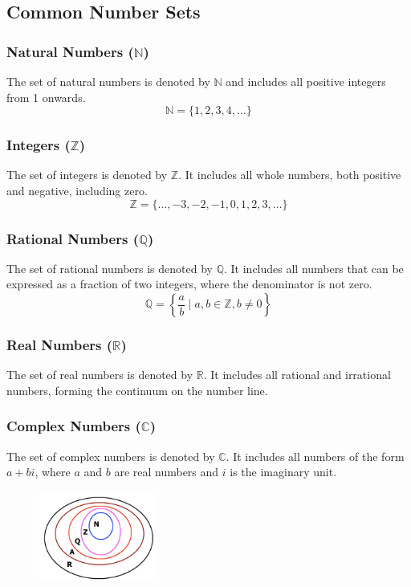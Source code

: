 \documentclass{article}
\begin{document}
\subsection{Common Number Sets}

\subsubsection*{Natural Numbers ($\mathbb{N}$)}
The set of natural numbers is denoted by $\mathbb{N}$ and includes all positive integers from 1 onwards. 
\[ \mathbb{N} = \{1, 2, 3, 4, \ldots\} \]

\subsubsection*{Integers ($\mathbb{Z}$)}
The set of integers is denoted by $\mathbb{Z}$. It includes all whole numbers, both positive and negative, including zero.
\[ \mathbb{Z} = \{\ldots, -3, -2, -1, 0, 1, 2, 3, \ldots\} \]

\subsubsection*{Rational Numbers ($\mathbb{Q}$)}
The set of rational numbers is denoted by $\mathbb{Q}$. It includes all numbers that can be expressed as a fraction of two integers, where the denominator is not zero.
\[ \mathbb{Q} = \left\{\frac{a}{b} \mid a,b \in \mathbb{Z}, b \neq 0\right\} \]

\subsubsection*{Real Numbers ($\mathbb{R}$)}
The set of real numbers is denoted by $\mathbb{R}$. It includes all rational and irrational numbers, forming the continuum on the number line.

\subsubsection*{Complex Numbers ($\mathbb{C}$)}
The set of complex numbers is denoted by $\mathbb{C}$. It includes all numbers of the form $a + bi$, where $a$ and $b$ are real numbers and $i$ is the imaginary unit.

\begin{figure}[ht]
    \centering
    \includegraphics[width=0.35\textwidth]{imgs/number-sets-nzqar.jpg}
    \end{figure}
\end{document}
